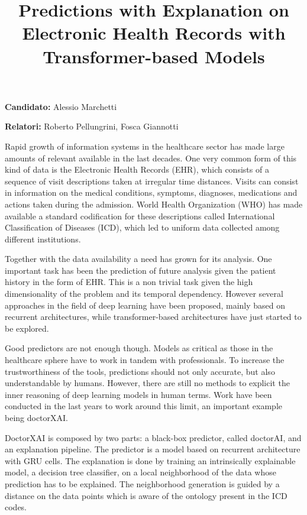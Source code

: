 \documentclass[]{marticle}
\title{\textbf{\huge Predictions with Explanation on Electronic Health Records with Transformer-based Models}}
\date{}
\author{}
\begin{document}
\maketitle

\textbf{Candidato:} Alessio Marchetti

\textbf{Relatori:} Roberto Pellungrini, Fosca Giannotti
\vspace{0.4cm}

Rapid growth of information systems in the healthcare sector has made large amounts of relevant
available in the last decades. One very common form of this kind of data is the Electronic Health
Records (EHR), which consists of a sequence of visit descriptions taken at irregular time
distances. Visits can consist in information on the medical conditions, symptoms, diagnoses,
medications and actions taken during the admission. World Health Organization (WHO) has made
available a standard codification for these descriptions called International Classification of
Diseases (ICD), which led to uniform data collected among different institutions.

Together with the data availability a need has grown for its analysis. One important task has been
the prediction of future analysis given the patient history in the form of EHR. This is a non
trivial task given the high dimensionality of the problem and its temporal dependency. However
several approaches in the field of deep learning have been proposed, mainly based on recurrent
architectures, while transformer-based architectures have just started to be explored.

Good predictors are not enough though. Models as critical as those in the healthcare sphere have to
work in tandem with professionals. To increase the trustworthiness of the tools, predictions should
not only accurate, but also understandable by humans. However, there are still no methods to explicit
the inner reasoning of deep learning models in human terms. Work have been conducted in the last
years to work around this limit, an important example being doctorXAI. 

DoctorXAI is composed by two parts: a black-box predictor, called doctorAI, and an explanation
pipeline. The predictor is a model based on recurrent architecture with GRU cells. The explanation
is done by training an intrinsically explainable model, a decision tree classifier, on a local
neighborhood of the data whose prediction has to be explained. The neighborhood generation is guided
by a distance on the data points which is aware of the ontology present in the ICD codes.
\end{document}
